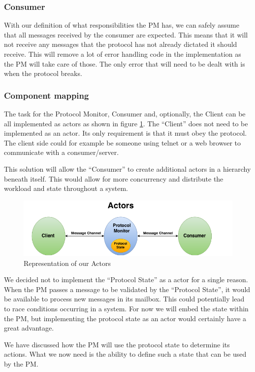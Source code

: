 \subsubsection{Consumer}
With our definition of what responsibilities the PM has, we can safely assume that all messages received by the consumer are expected. This means that it will not receive any messages that the protocol has not already dictated it should receive. This will remove a lot of error handling code in the implementation as the PM will take care of those. The only error that will need to be dealt with is when the protocol breaks.  


\subsubsection{Component mapping}
The task for the Protocol Monitor, Consumer and, optionally, the Client can be all implemented as actors as shown in figure \ref{fig:ArchitectureMapping}. The ``Client'' does not need to be implemented as an actor. Its only requirement is that it must obey the protocol. The client side could for example be someone using telnet or a web browser to communicate with a consumer/server.

This solution will allow the ``Consumer'' to create additional actors in a hierarchy beneath itself. This would allow for more concurrency and distribute the workload and state throughout a system.
\begin{figure}[h]
	\centering
	\includegraphics[scale=0.45]{images/architecture/ArchitectureMapping.png} 
	\caption{Representation of our Actors}
	\label{fig:ArchitectureMapping}
\end{figure}
We decided not to implement the ``Protocol State'' as a actor for a single reason. When the PM passes a message to be validated by the ``Protocol State'', it would be available to process new messages in its mailbox. This could potentially lead to race conditions occurring in a system. For now we will embed the state within the PM, but implementing the protocol state as an actor would certainly have a great advantage.

We have discussed how the PM will use the protocol state to determine its actions. What we now need is the ability to define such a state that can be used by the PM.


